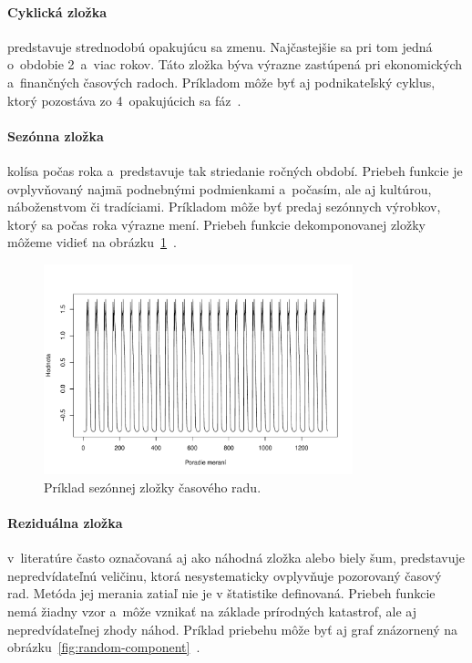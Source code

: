 \documentclass[a4paper,twoside,slovak,12pt,appendix]{article}
\begin{document}
\paragraph{Cyklická zložka} predstavuje strednodobú opakujúcu sa zmenu.
Najčastejšie sa pri tom jedná o~obdobie 2~a~viac rokov. Táto zložka býva výrazne
zastúpená pri ekonomických a~finančných časových radoch. Príkladom môže byť
aj podnikateľský cyklus, ktorý pozostáva zo 4~opakujúcich sa
fáz~\cite{Agrawal2013}.

\paragraph{Sezónna zložka} kolísa počas roka a~predstavuje tak striedanie
ročných období. Priebeh funkcie je ovplyvňovaný najmä podnebnými podmienkami
a~počasím, ale aj kultúrou, náboženstvom či tradíciami. Príkladom môže byť
predaj sezónnych výrobkov, ktorý sa počas roka výrazne mení. Priebeh funkcie
dekomponovanej zložky môžeme vidieť na
obrázku~\ref{fig:seasonal-component}~\cite{Agrawal2013}.

\begin{figure}[H]
  \centering
  \includegraphics[width=0.8\textwidth]{season_component.pdf}
  \caption{Príklad sezónnej zložky časového radu.}
  \label{fig:seasonal-component}
\end{figure}

\paragraph{Reziduálna zložka} v~literatúre často označovaná aj ako náhodná
zložka alebo biely šum, predstavuje nepredvídateľnú veličinu, ktorá
nesystematicky ovplyvňuje pozorovaný časový rad. Metóda jej merania zatiaľ nie
je v štatistike definovaná. Priebeh funkcie nemá žiadny vzor a~môže vznikať na
základe prírodných katastrof, ale aj nepredvídateľnej zhody náhod. Príklad
priebehu môže byť aj graf znázornený na
obrázku~\ref{fig:random-component}~\cite{Agrawal2013}.
\end{document}
